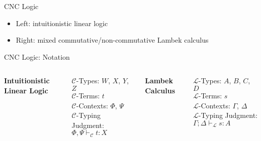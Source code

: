 \documentclass{beamer}
\begin{document}
\begin{frame}{CNC Logic}

\begin{itemize}
\item Left: intuitionistic linear logic
\item Right: mixed commutative/non-commutative Lambek calculus
\end{itemize}

\begin{center}
\end{center}

\end{frame}

\begin{frame}{CNC Logic: Notation}

\begin{columns}
  \centerline{\textbf{Intuitionistic Linear Logic}}

  $\mathcal{C}$-Types: $W$, $X$, $Y$, $Z$ \\
  $\mathcal{C}$-Terms: $t$ \\
  $\mathcal{C}$-Contexts: $\Phi$, $\Psi$ \\
  $\mathcal{C}$-Typing Judgment: $\Phi,\Psi \vdash_\mathcal{C} t:X$

  \centerline{\textbf{Lambek Calculus}}

  $\mathcal{L}$-Types: $A$, $B$, $C$, $D$ \\
  $\mathcal{L}$-Terms: $s$ \\
  $\mathcal{L}$-Contexts: $\Gamma$, $\Delta$ \\
  $\mathcal{L}$-Typing Judgment: $\Gamma;\Delta \vdash_\mathcal{L} s:A$
\end{columns}

\end{frame}
\end{document}
